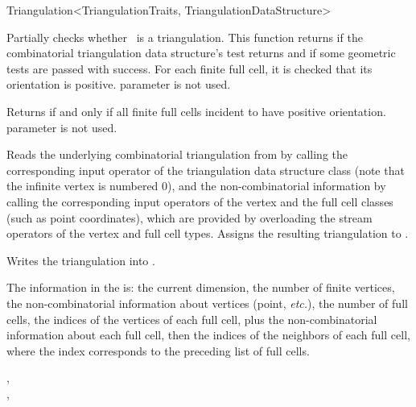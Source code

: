 \begin{ccRefClass}{Triangulation<TriangulationTraits, TriangulationDataStructure>}
\begin{ccDebug}
{Partially checks whether \ccVar\ is a triangulation. This function returns
 if the combinatorial triangulation data structure's 
test returns  and if some geometric tests are passed with success.
For each finite full cell, it is checked that its orientation is
positive.
 parameter is not used.
}

 {Returns  if and only if all
finite full cells incident to  have positive orientation.
 parameter is not used.
}

\end{ccDebug}


{Reads the underlying combinatorial triangulation from  by
calling the corresponding input operator of the triangulation data
structure class (note that the infinite vertex is numbered 0), and the
non-combinatorial information by calling the corresponding input
operators of the vertex and the full cell classes (such as point
coordinates), which are provided by overloading the stream operators
of the vertex and full cell types. Assigns the resulting triangulation to
.}

{Writes the triangulation  into .}

The information in the  is: the current dimension, the number of
finite vertices, the non-combinatorial information about vertices (point,
\emph{etc.}), the number of full cells, the indices of the vertices of each
full cell, plus the non-combinatorial information about each full cell, then the
indices of the neighbors of each full cell, where the index corresponds to the
preceding list of full cells.

\ccSeeAlso

,\\
,\\

\end{ccRefClass}

